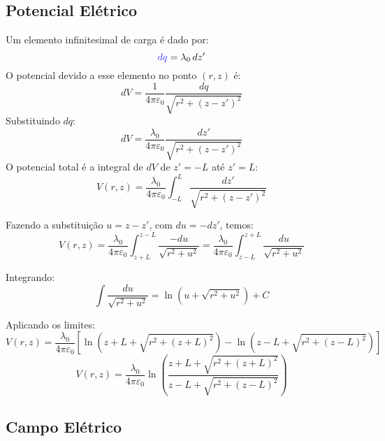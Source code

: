 \documentclass[a4paper,12pt]{article}
\begin{document}
\subsection*{Potencial Elétrico}

Um elemento infinitesimal de carga é dado por:
\begin{equation}
\textcolor{blue!80}{dq} = \lambda_0 \, dz'
\end{equation}
O potencial devido a esse elemento no ponto \( (r, z) \) é:
\begin{equation}
dV = \frac{1}{4\pi\varepsilon_0} \frac{dq}{\sqrt{r^2 + (z - z')^2}}
\end{equation}
Substituindo \( dq \):
\begin{equation}
dV = \frac{\lambda_0}{4\pi\varepsilon_0} \frac{dz'}{\sqrt{r^2 + (z - z')^2}}
\end{equation}
O potencial total é a integral de \( dV \) de \( z' = -L \) até \( z' = L \):
\begin{equation}
V(r,z) = \frac{\lambda_0}{4\pi\varepsilon_0} \int_{-L}^{L} \frac{dz'}{\sqrt{r^2 + (z - z')^2}}
\end{equation}

Fazendo a substituição \( u = z - z' \), com \( du = -dz' \), temos:
\begin{equation}
V(r,z) = \frac{\lambda_0}{4\pi\varepsilon_0} \int_{z+L}^{z-L} \frac{-du}{\sqrt{r^2 + u^2}} = \frac{\lambda_0}{4\pi\varepsilon_0} \int_{z-L}^{z+L} \frac{du}{\sqrt{r^2 + u^2}}
\end{equation}

Integrando:
\begin{equation}
\int \frac{du}{\sqrt{r^2 + u^2}} = \ln\left(u + \sqrt{r^2 + u^2}\right) + C
\end{equation}

Aplicando os limites:
\begin{equation}
V(r,z) = \frac{\lambda_0}{4\pi\varepsilon_0} \left[ \ln\left(z+L + \sqrt{r^2 + (z+L)^2}\right) - \ln\left(z-L + \sqrt{r^2 + (z-L)^2}\right) \right]
\end{equation}
\begin{equation}
\boxed{
V(r,z) = \frac{\lambda_0}{4\pi\varepsilon_0} \ln\left( \frac{z+L + \sqrt{r^2 + (z+L)^2}}{z-L + \sqrt{r^2 + (z-L)^2}} \right)
}
\end{equation}

\subsection*{Campo Elétrico}
\end{document}
